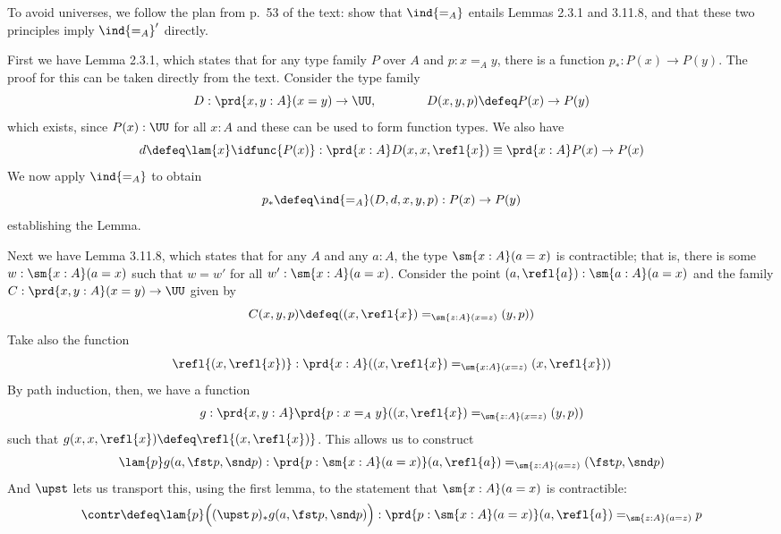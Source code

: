  \soln
To avoid universes, we follow the plan from p.~53 of the text: show that
$\ind{=_{A}}$ entails Lemmas 2.3.1 and 3.11.8, and that these two principles
imply $\ind{=_{A}}'$ directly.  


First we have Lemma 2.3.1, which states that for any type family $P$ over $A$
    and $p : x =_{A} y$, there is a function $p_{*} : P(x) \to P(y)$.  The proof
    for this can be taken directly from the text.  Consider the type family
    \[
    D : \prd{x, y : A}(x = y) \to \UU,
    \qquad\qquad
    D(x, y, p) \defeq P(x) \to P(y)
    \]
    which exists, since $P(x) : \UU$ for all $x : A$ and these can be used to form
    function types.  We also have
    \[
    d \defeq \lam{x}\idfunc{P(x)} 
    : \prd{x:A}D(x, x, \refl{x})
    \equiv \prd{x:A} P(x) \to P(x)
    \]
    We now apply $\ind{=_{A}}$ to obtain
    \[
    p_{*} \defeq \ind{=_{A}}(D, d, x, y, p) : P(x) \to P(y)
    \]
    establishing the Lemma.


    Next we have Lemma 3.11.8, which states that for any $A$ and any $a : A$, the
        type $\sm{x:A} (a = x)$ is contractible;  that is, there is some $w :
        \sm{x:A}(a=x)$ such that $w = w'$ for all $w' : \sm{x:A}(a=x)$.  Consider the
        point $(a, \refl{a}) : \sm{a:A}(a=x)$ and the family $C: \prd{x,y:A}(x=y) \to \UU$ given
        by
        \[
        C(x, y, p) \defeq 
        ((x, \refl{x}) =_{\sm{z:A}(x=z)} (y, p))
        \]
        Take also the function
        \[
        \refl{(x, \refl{x})} : \prd{x:A} ((x, \refl{x}) =_{\sm{x:A}(x=z)} (x, \refl{x}))
        \]
        By path induction, then, we have a function
        \[
        g : \prd{x, y:A}\prd{p:x =_{A} y} 
        ((x, \refl{x}) =_{\sm{z:A}(x=z)} (y, p))
        \]
        such that $g(x, x, \refl{x}) \defeq \refl{(x, \refl{x})}$.  
        This allows us to construct
        \[
        \lam{p}g(a, \fst p, \snd p) : 
        \prd{p:\sm{x:A}(a=x)}
        (a, \refl{a}) =_{\sm{z:A}(a=z)} (\fst p, \snd p)
        \]
        And $\upst$ lets us transport this, using the first lemma, to the statement
        that $\sm{x:A}(a=x)$ is contractible:
        \[
        \contr \defeq \lam{p}\Big(
        (\upst\,p)_{*}g(a, \fst p, \snd p)
        \Big)
        :
        \prd{p:\sm{x:A}(a=x)}
        (a, \refl{a}) =_{\sm{z:A}(a=z)} p
        \]


